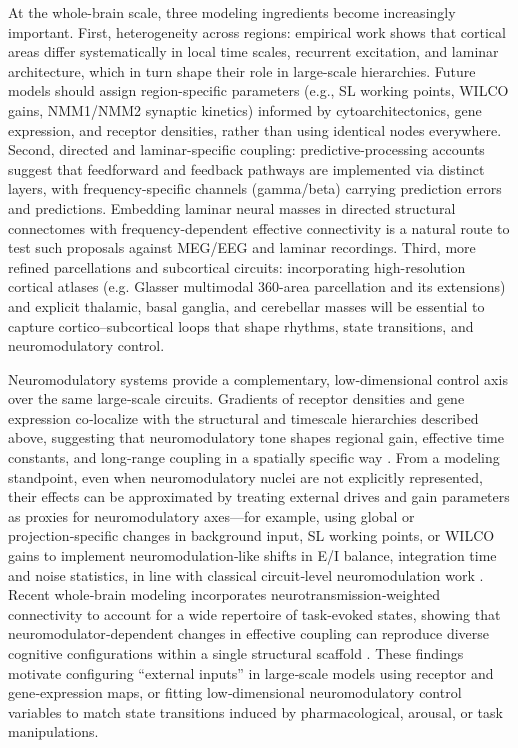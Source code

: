 \documentclass[12pt]{article}
\numberwithin{equation}{section}
\begin{document}
At the whole-brain scale, three modeling ingredients become increasingly important. First, heterogeneity across regions: empirical work shows that cortical areas differ systematically in local time scales, recurrent excitation, and laminar architecture, which in turn shape their role in large-scale hierarchies.\cite{mejiasFeedforwardFeedbackFrequencydependent2016,rautOrganizationPropagatedIntrinsic2020} Future models should assign region-specific parameters (e.g., SL working points, WILCO gains, NMM1/NMM2 synaptic kinetics) informed by cytoarchitectonics, gene expression, and receptor densities, rather than using identical nodes everywhere. Second, directed and laminar-specific coupling: predictive-processing accounts suggest that feedforward and feedback pathways are implemented via distinct layers, with frequency-specific channels (gamma/beta) carrying prediction errors and predictions.\cite{bastosCanonicalMicrocircuitsPredictive2012,fristonFreeenergyPrincipleUnified2010} Embedding laminar neural masses in directed structural connectomes with frequency-dependent effective connectivity is a natural route to test such proposals against MEG/EEG and laminar recordings. Third, more refined parcellations and subcortical circuits: incorporating high-resolution cortical atlases (e.g. Glasser multimodal 360-area parcellation and its extensions)\cite{glasserMultimodalParcellationHuman2016} and explicit thalamic, basal ganglia, and cerebellar masses\cite{kringelbach_dynamic_2020,cofreWholeBrainModelsExplore2020,rautOrganizationPropagatedIntrinsic2020} will be essential to capture cortico–subcortical loops that shape rhythms, state transitions, and neuromodulatory control.

Neuromodulatory systems provide a complementary, low‑dimensional control axis over the same large‑scale circuits. Gradients of receptor densities and gene expression co‑localize with the structural and timescale hierarchies described above, suggesting that neuromodulatory tone shapes regional gain, effective time constants, and long‑range coupling in a spatially specific way \cite{demirtasHierarchicalHeterogeneityHuman2019,burtHierarchyTranscriptomicSpecialization2018}. From a modeling standpoint, even when neuromodulatory nuclei are not explicitly represented, their effects can be approximated by treating external drives and gain parameters as proxies for neuromodulatory axes—for example, using global or projection‑specific changes in background input, SL working points, or WILCO gains to implement neuromodulation‑like shifts in E/I balance, integration time and noise statistics, in line with classical circuit‑level neuromodulation work \cite{marderNeuromodulationNeuronalCircuits2012}. Recent whole‑brain modeling incorporates neurotransmission‑weighted connectivity to account for a wide repertoire of task‑evoked states, showing that neuromodulator‑dependent changes in effective coupling can reproduce diverse cognitive configurations within a single structural scaffold  \cite{decoEvolutionsBoldestTrick2025}. These findings motivate configuring “external inputs” in large‑scale models using receptor and gene‑expression maps, or fitting low‑dimensional neuromodulatory control variables to match state transitions induced by pharmacological, arousal, or task manipulations.
\end{document}
